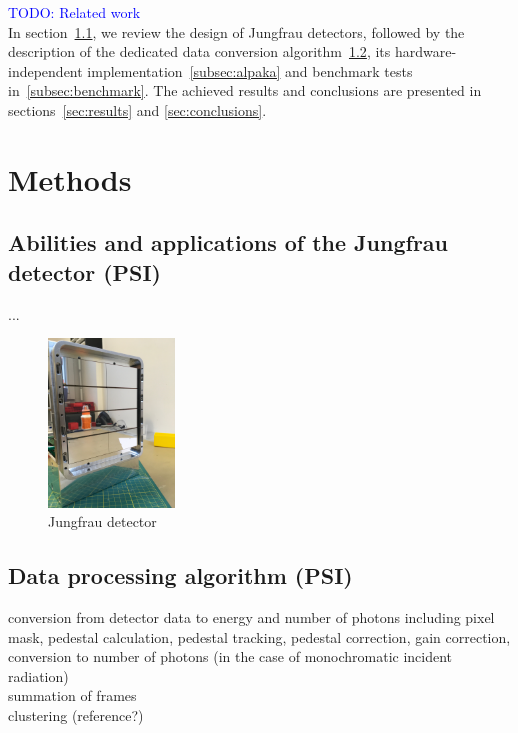 \documentclass[a4paper]{article}
\begin{document}
\textcolor{blue}{TODO: Related work}\\

In section~\ref{subsec:det}, we review the design of Jungfrau detectors, followed by the description of the dedicated data conversion algorithm~\ref{subsec:alg}, its hardware-independent implementation~\ref{subsec:alpaka} and benchmark tests in~\ref{subsec:benchmark}. The achieved results and conclusions are presented in sections~\ref{sec:results} and \ref{sec:conclusions}. 


\section{Methods}
\subsection{Abilities and applications of the Jungfrau detector (PSI)}
\label{subsec:det}
...




\begin{figure}[h!]
\centering
\includegraphics[width=0.30\textwidth]{jungfraudetector.jpg}
\caption{Jungfrau detector}
\label{fig:jfdetector}
\end{figure}


\subsection{Data processing algorithm (PSI)}
\label{subsec:alg}
conversion from detector data to energy and number of photons including pixel mask, pedestal calculation, pedestal tracking, pedestal correction, gain correction, conversion to number of photons (in the case of monochromatic incident radiation)\\

 summation of frames\\

 clustering (reference?)\\
\end{document}
